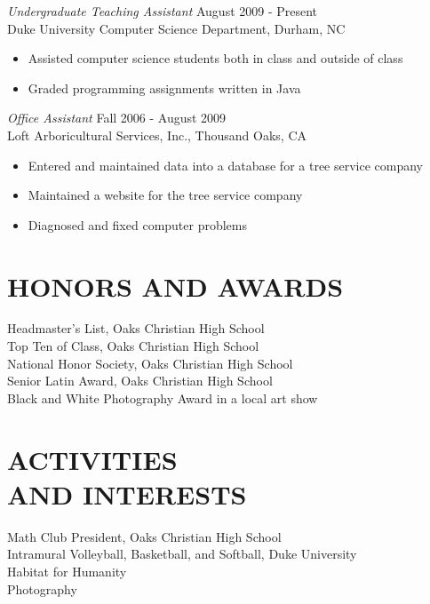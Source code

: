 \documentclass[line,margin]{res}
\begin{document}
\begin{resume}
				{\sl Undergraduate Teaching Assistant} \hfill August 2009 - Present \\
                Duke University Computer Science Department, 
                Durham, NC
                 \begin{itemize}  \itemsep -2pt %
                 \item Assisted computer science students both in class and outside of class
				 \item Graded programming assignments written in Java
                \end{itemize}
 
                {\sl Office Assistant} \hfill            Fall 2006 - August 2009 \\
                Loft Arboricultural Services, Inc., Thousand Oaks, CA 
                 \begin{itemize}  \itemsep -2pt %
                 \item Entered and maintained data into a database for a tree service company
				 \item Maintained a website for the tree service company
 				 \item Diagnosed and fixed computer problems
                 \end{itemize} 
                

\section{HONORS AND AWARDS}
	Headmaster's List, Oaks Christian High School \\
	Top Ten of Class, Oaks Christian High School \\
	National Honor Society, Oaks Christian High School \\
	Senior Latin Award, Oaks Christian High School \\
	Black and White Photography Award in a local art show

\section{ACTIVITIES \\ AND INTERESTS}             
 			Math Club President, Oaks Christian High School \\
			Intramural Volleyball, Basketball, and Softball, Duke University \\
			Habitat for Humanity \\
			Photography
\end{resume}
\end{document}
